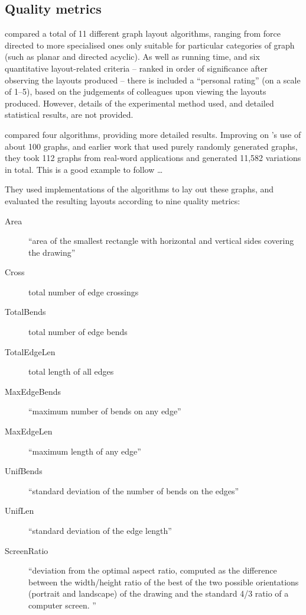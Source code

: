 \subsection{Quality metrics}

\citet{Himsolt95comparingand} compared a total of 11 different graph layout algorithms, ranging from force directed to more specialised ones only suitable for particular categories of graph (such as planar and directed acyclic).
As well as running time, and six quantitative layout-related criteria -- ranked in order of significance after observing the layouts produced -- there is included a ``personal rating'' (on a scale of 1--5), based on the judgements of colleagues upon viewing the layouts produced.
However, details of the experimental method used, and detailed statistical results, are not provided.

\citet{DiBattista1997303} compared four algorithms, providing more detailed results.
Improving on \citeauthor{Himsolt95comparingand}'s use of about 100 graphs, and earlier work  that used purely randomly generated graphs, they took 112 graphs from real-word applications and generated 11,582 variations in total. This is a good example to follow \ldots

They used implementations of the algorithms to lay out these graphs, and evaluated the resulting layouts according to nine quality metrics:

\begin{description}
    \item[Area]
``area of the smallest rectangle with horizontal and vertical sides covering the drawing''
    \item[Cross]
total number of edge crossings
    \item[TotalBends]
total number of edge bends
    \item[TotalEdgeLen]
total length of all edges
    \item[MaxEdgeBends]
``maximum number of bends on any edge''
    \item[MaxEdgeLen]
``maximum length of any edge''
    \item[UnifBends]
``standard deviation of the number of bends on the edges''
    \item[UnifLen]
``standard deviation of the edge length''
    \item[ScreenRatio]
``deviation from the optimal aspect ratio, computed as the difference between the width/height ratio of the best of the two possible orientations (portrait and landscape) of the drawing and the standard 4/3 ratio of a computer screen. ''
\end{description}

